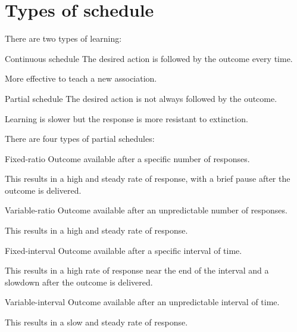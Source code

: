 \section{Types of schedule}

There are two types of learning:
\begin{descriptionlist}
    \item[Continuous schedule] 
        The desired action is followed by the outcome every time.
        \begin{remark}
            More effective to teach a new association.
        \end{remark}

    \item[Partial schedule] 
        The desired action is not always followed by the outcome.
        \begin{remark}
            Learning is slower but the response is more resistant to extinction.
        \end{remark}

        There are four types of partial schedules:
        \begin{descriptionlist}
            \item[Fixed-ratio] 
                Outcome available after a specific number of responses.

                This results in a high and steady rate of response, with a brief pause after the outcome is delivered.


            \item[Variable-ratio] 
                Outcome available after an unpredictable number of responses.

                This results in a high and steady rate of response.


            \item[Fixed-interval] 
                Outcome available after a specific interval of time.

                This results in a high rate of response near the end of the interval and a slowdown after the outcome is delivered.


            \item[Variable-interval] 
                Outcome available after an unpredictable interval of time.

                This results in a slow and steady rate of response.
        \end{descriptionlist}
\end{descriptionlist}

